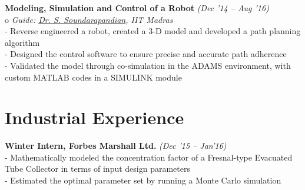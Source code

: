 \documentclass[margin,line]{res}
\begin{document}
\begin{resume}
\textbullet\hspace{0.005cm} {\bf Modeling, Simulation and Control of a Robot }\hfill {\em (Dec '14 -- Aug '16)}\\
o {\em Guide: \href {https://home.iitm.ac.in/sspandian/} {\color{RoyalPurple} Dr. S. Soundarapandian}, IIT Madras}\\
- Reverse engineered a robot, created a 3-D model and developed a path planning algorithm\\
- Designed the control software to ensure precise and accurate path adherence\\
- Validated the model through co-simulation in the ADAMS environment, with custom MATLAB codes in a SIMULINK module \\



\section {\sc Industrial Experience}
\textbullet\hspace{0.005cm} {\bf Winter Intern, Forbes Marshall Ltd. }\hfill {\em (Dec '15 -- Jan'16)}\\
- Mathematically modeled the concentration factor of a Fresnal-type Evacuated Tube Collector in terms of input design parameters\\
- Estimated the optimal parameter set by running a Monte Carlo simulation


\end{resume}
\end{document}

